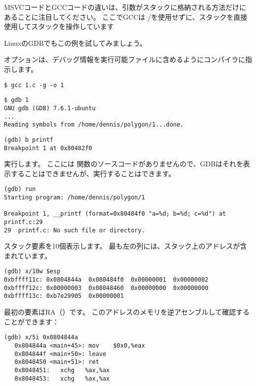 MSVCコードとGCCコードの違いは、引数がスタックに格納される方法だけにあることに注目してください。 
ここでGCCは \PUSH/\POP を使用せずに、スタックを直接使用してスタックを操作しています


Linuxの\ac{GDB}でもこの例を試してみましょう。

オプションは、デバッグ情報を実行可能ファイルに含めるようにコンパイラに指示します。

\begin{lstlisting}
$ gcc 1.c -g -o 1
\end{lstlisting}

\begin{lstlisting}
$ gdb 1
GNU gdb (GDB) 7.6.1-ubuntu
...
Reading symbols from /home/dennis/polygon/1...done.
\end{lstlisting}

\begin{lstlisting}[caption= \printf にブレークポイントを設定しましょう]
(gdb) b printf
Breakpoint 1 at 0x80482f0
\end{lstlisting}

実行します。
ここには \printf 関数のソースコードがありませんので、\ac{GDB}はそれを表示することはできませんが、実行することはできます。

\begin{lstlisting}
(gdb) run
Starting program: /home/dennis/polygon/1 

Breakpoint 1, __printf (format=0x80484f0 "a=%d; b=%d; c=%d") at printf.c:29
29	printf.c: No such file or directory.
\end{lstlisting}

スタック要素を10個表示します。 最も左の列には、スタック上のアドレスが含まれています。

\begin{lstlisting}
(gdb) x/10w $esp
0xbffff11c:	0x0804844a	0x080484f0	0x00000001	0x00000002
0xbffff12c:	0x00000003	0x08048460	0x00000000	0x00000000
0xbffff13c:	0xb7e29905	0x00000001
\end{lstlisting}

最初の要素は\ac{RA}（）です。 
このアドレスのメモリを逆アセンブルして確認することができます：

\begin{lstlisting}[label=NOP_as_XCHG_example,style=customasmx86]
(gdb) x/5i 0x0804844a
   0x804844a <main+45>:	mov    $0x0,%eax
   0x804844f <main+50>:	leave  
   0x8048450 <main+51>:	ret    
   0x8048451:	xchg   %ax,%ax
   0x8048453:	xchg   %ax,%ax
\end{lstlisting}

